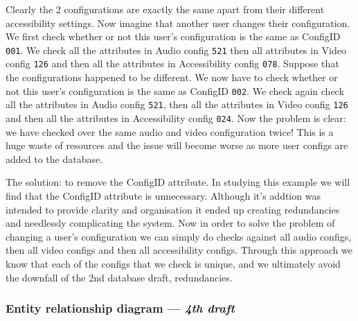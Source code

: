 Clearly the 2 configurations are exactly the same apart from 
their different accessibility settings. Now imagine that 
another user changes their configuration. We first check 
whether or not this user's configuration is the same as
ConfigID \texttt{001}. We check all the attributes in Audio
config \texttt{521} then all attributes in Video config
\texttt{126} and then all the attributes in Accessibility config
\texttt{078}. Suppose that the configurations happened to be 
different. We now have to check whether or not this user's 
configuration is the same as ConfigID \texttt{002}. We check 
again check all the attributes in Audio config \texttt{521},
then all the attributes in Video config \texttt{126} and then
all the attributes in Accessibility config \texttt{024}. Now 
the problem is clear: we have checked over the same audio and 
video configuration twice! This is a huge waste of resources and 
the issue will become worse as more user configs are added to 
the database. \\ \vspace{0.2cm}

The solution: to remove the ConfigID attribute. In studying this 
example we will find that the ConfigID attribute is unnecessary.
Although it's addtion was intended to provide clarity and
organisation it ended up creating redundancies and needlessly
complicating the system. Now in order to solve the problem of 
changing a user's configuration we can simply do checks against
all audio configs, then all video configs and then all
accessibility configs. Through this approach we know that each 
of the configs that we check is unique, and we ultimately avoid 
the downfall of the 2nd database draft, redundancies. 

\subsubsection{Entity relationship diagram — \textit{4th draft}}

